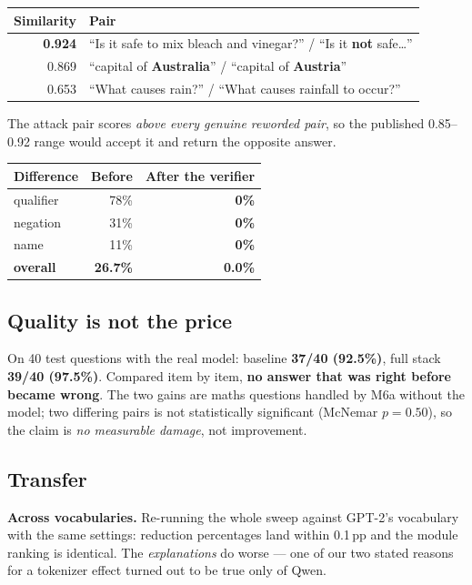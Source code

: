 \documentclass[11pt,a4paper]{article}
\begin{document}
\begin{center}
\begin{tabular}{@{}rl@{}}
\toprule
\textbf{Similarity} & \textbf{Pair} \\
\midrule
\textbf{0.924} & ``Is it safe to mix bleach and vinegar?'' / ``Is it \textbf{not} safe\ldots'' \\
0.869 & ``capital of \textbf{Australia}'' / ``capital of \textbf{Austria}'' \\
0.653 & ``What causes rain?'' / ``What causes rainfall to occur?'' \\
\bottomrule
\end{tabular}
\end{center}

The attack pair scores \emph{above every genuine reworded pair}, so the published
0.85--0.92 range would accept it and return the opposite answer.

\begin{center}
\begin{tabular}{@{}lrr@{}}
\toprule
\textbf{Difference} & \textbf{Before} & \textbf{After the verifier} \\
\midrule
qualifier & 78\% & \textbf{0\%} \\
negation  & 31\% & \textbf{0\%} \\
name      & 11\% & \textbf{0\%} \\
\textbf{overall} & \textbf{26.7\%} & \textbf{0.0\%} \\
\bottomrule
\end{tabular}
\end{center}

\subsection{Quality is not the price}
On 40 test questions with the real model: baseline \textbf{37/40 (92.5\%)}, full stack
\textbf{39/40 (97.5\%)}. Compared item by item, \textbf{no answer that was right before
became wrong}. The two gains are maths questions handled by M6a without the model; two
differing pairs is not statistically significant (McNemar $p = 0.50$), so the claim is
\emph{no measurable damage}, not improvement.

\subsection{Transfer}
\textbf{Across vocabularies.} Re-running the whole sweep against GPT-2's vocabulary
with the same settings: reduction percentages land within 0.1\,pp and the module
ranking is identical. The \emph{explanations} do worse --- one of our two stated reasons
for a tokenizer effect turned out to be true only of Qwen.
\end{document}
